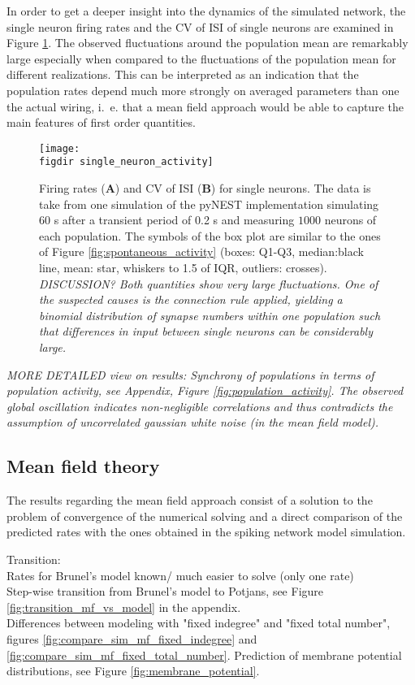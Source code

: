 In order to get a deeper insight into the dynamics of the simulated network, the single neuron firing 
rates and the CV of ISI of single neurons are examined in Figure \ref{fig:single_neuron_activity}.
The observed fluctuations around the population mean are remarkably large especially when compared 
to the fluctuations of the population mean for different realizations. This can be interpreted as 
an indication that the population rates depend much more strongly on averaged parameters than one 
the actual wiring, i.~e. that a mean field approach would be able to capture the main features 
of first order quantities. 
\begin{figure}[htpb]
    \centering
    \texttt{[image: \\figdir single\_neuron\_activity]}
    \caption{
        Firing rates (\textbf{A}) and CV of ISI (\textbf{B}) for single neurons. 
        The data is take from one simulation of the pyNEST implementation 
        simulating $60$ s after a transient period of 0.2 s and measuring 
        $1000$ neurons of each population. The symbols of the box plot 
        are similar to the ones of Figure \ref{fig:spontaneous_activity} 
        (boxes: Q1-Q3, median:black line, mean: star, 
        whiskers to 1.5 of IQR, outliers: crosses). 
        \emph{DISCUSSION?
        Both quantities show very large fluctuations. One of the suspected
        causes is the connection rule applied, yielding a binomial distribution 
        of synapse numbers within one population
        such that differences in input between single neurons can be 
    considerably large.}
    }
    \label{fig:single_neuron_activity}
\end{figure}


\emph{MORE DETAILED view on results:
Synchrony of populations in terms of population activity, 
see Appendix, Figure \ref{fig:population_activity}. 
The observed global oscillation indicates non-negligible correlations
and thus contradicts the assumption of uncorrelated gaussian white noise 
(in the mean field model).}

\subsection{Mean field theory}
The results regarding the mean field approach consist of a solution to the problem 
of convergence of the numerical solving and a direct comparison of the predicted rates
with the ones obtained in the spiking network model simulation.

Transition: \\
Rates for Brunel's model known/ much easier to solve (only one rate) \\
Step-wise transition from Brunel's model to Potjans, see Figure \ref{fig:transition_mf_vs_model} 
in the appendix. \\
Differences between modeling with "fixed indegree" and "fixed total number",
figures \ref{fig:compare_sim_mf_fixed_indegree} and 
\ref{fig:compare_sim_mf_fixed_total_number}.
Prediction of membrane potential distributions, see Figure
\ref{fig:membrane_potential}. 

